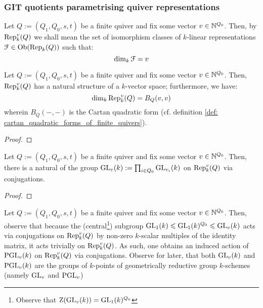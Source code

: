         \subsubsection{GIT quotients parametrising quiver representations}
            \begin{convention}
                Let $Q := (Q_1, Q_0, s, t)$ be a finite quiver and fix some vector $v \in \mathbb{N}^{Q_0}$. Then, by $\mathrm{Rep}_k^v(Q)$ we shall mean the set of isomorphism classes of $k$-linear representations $\mathcal{F} \in \mathrm{Ob}(\mathrm{Rep}_k(Q))$ such that:
                    $$\dim_k \mathcal{F} = v$$
            \end{convention}
            \begin{proposition}
                Let $Q := (Q_1, Q_0, s, t)$ be a finite quiver and fix some vector $v \in \mathbb{N}^{Q_0}$. Then, $\mathrm{Rep}_k^v(Q)$ has a natural structure of a $k$-vector space; furthermore, we have:
                    $$\dim_k \mathrm{Rep}_k^v(Q) = B_Q(v, v)$$
                wherein $B_Q(-, -)$ is the Cartan quadratic form (cf. definition \ref{def: cartan_quadratic_forms_of_finite_quivers}).
            \end{proposition}
                \begin{proof}
                            
                \end{proof}
            \begin{corollary}
                Let $Q := (Q_1, Q_0, s, t)$ be a finite quiver and fix some vector $v \in \mathbb{N}^{Q_0}$. Then, there is a natural of the group $\mathrm{GL}_v(k) := \prod_{i \in Q_0} \mathrm{GL}_{v_i}(k)$ on $\mathrm{Rep}_k^v(Q)$ via conjugations. 
            \end{corollary}
                \begin{proof}
                    
                \end{proof}
            \begin{remark} \label{remark: general_linear_group_action_on_quiver_representations}
                Let $Q := (Q_1, Q_0, s, t)$ be a finite quiver and fix some vector $v \in \mathbb{N}^{Q_0}$. Then, observe that because the (central\footnote{Observe that $\mathrm{Z}(\mathrm{GL}_v(k)) = \mathrm{GL}_1(k)^{Q_0}$}) subgroup $\mathrm{GL}_1(k) \leqslant \mathrm{GL}_1(k)^{Q_0} \leqslant \mathrm{GL}_v(k)$ acts via conjugations on $\mathrm{Rep}_k^v(Q)$ by non-zero $k$-scalar multiples of the identity matrix, it acts trivially on $\mathrm{Rep}_k^v(Q)$. As such, one obtains an induced action of $\mathrm{PGL}_v(k)$ on $\mathrm{Rep}_k^v(Q)$ via conjugations. Observe for later, that both $\mathrm{GL}_v(k)$ and $\mathrm{PGL}_v(k)$ are the groups of $k$-points of geometrically reductive group $k$-schemes (namely $\mathrm{GL}_v$ and $\mathrm{PGL}_v$)
            \end{remark}
